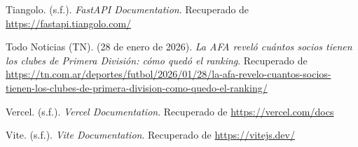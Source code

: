 \hangindent=1.25cm
Tiangolo. (s.f.). \textit{FastAPI Documentation}. Recuperado de \url{https://fastapi.tiangolo.com/}
\vspace{0.4cm}

\hangindent=1.25cm
Todo Noticias (TN). (28 de enero de 2026). \textit{La AFA reveló cuántos socios tienen los clubes de Primera División: cómo quedó el ranking}. Recuperado de \url{https://tn.com.ar/deportes/futbol/2026/01/28/la-afa-revelo-cuantos-socios-tienen-los-clubes-de-primera-division-como-quedo-el-ranking/}
\vspace{0.4cm}

\hangindent=1.25cm
Vercel. (s.f.). \textit{Vercel Documentation}. Recuperado de \url{https://vercel.com/docs}
\vspace{0.4cm}

\hangindent=1.25cm
Vite. (s.f.). \textit{Vite Documentation}. Recuperado de \url{https://vitejs.dev/}
\vspace{0.4cm}

\endgroup

